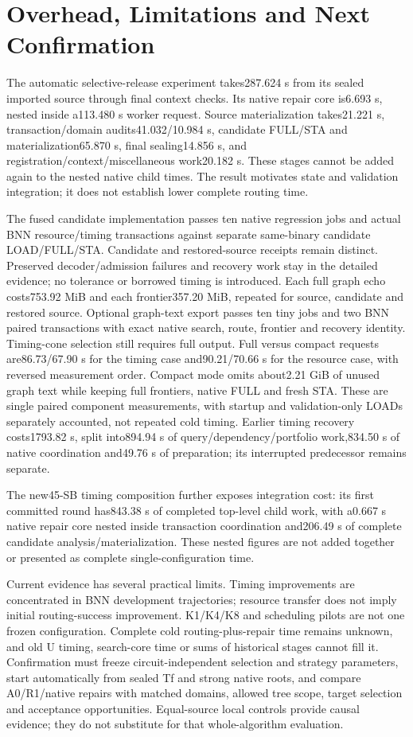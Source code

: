 \documentclass[conference,10pt]{IEEEtran}
\begin{document}
\section{Overhead, Limitations and Next Confirmation}
The automatic selective-release experiment takes287.624 s from its sealed imported source through final context checks. Its native repair core is6.693 s, nested inside a113.480 s worker request. Source materialization takes21.221 s, transaction/domain audits41.032/10.984 s, candidate FULL/STA and materialization65.870 s, final sealing14.856 s, and registration/context/miscellaneous work20.182 s. These stages cannot be added again to the nested native child times. The result motivates state and validation integration; it does not establish lower complete routing time.

The fused candidate implementation passes ten native regression jobs and actual BNN resource/timing transactions against separate same-binary candidate LOAD/FULL/STA. Candidate and restored-source receipts remain distinct. Preserved decoder/admission failures and recovery work stay in the detailed evidence; no tolerance or borrowed timing is introduced. Each full graph echo costs753.92 MiB and each frontier357.20 MiB, repeated for source, candidate and restored source. Optional graph-text export passes ten tiny jobs and two BNN paired transactions with exact native search, route, frontier and recovery identity. Timing-cone selection still requires full output. Full versus compact requests are86.73/67.90 s for the timing case and90.21/70.66 s for the resource case, with reversed measurement order. Compact mode omits about2.21 GiB of unused graph text while keeping full frontiers, native FULL and fresh STA. These are single paired component measurements, with startup and validation-only LOADs separately accounted, not repeated cold timing. Earlier timing recovery costs1793.82 s, split into894.94 s of query/dependency/portfolio work,834.50 s of native coordination and49.76 s of preparation; its interrupted predecessor remains separate.

The new45-SB timing composition further exposes integration cost: its first committed round has843.38 s of completed top-level child work, with a0.667 s native repair core nested inside transaction coordination and206.49 s of complete candidate analysis/materialization. These nested figures are not added together or presented as complete single-configuration time.

Current evidence has several practical limits. Timing improvements are concentrated in BNN development trajectories; resource transfer does not imply initial routing-success improvement. K1/K4/K8 and scheduling pilots are not one frozen configuration. Complete cold routing-plus-repair time remains unknown, and old U timing, search-core time or sums of historical stages cannot fill it. Confirmation must freeze circuit-independent selection and strategy parameters, start automatically from sealed Tf and strong native roots, and compare A0/R1/native repairs with matched domains, allowed tree scope, target selection and acceptance opportunities. Equal-source local controls provide causal evidence; they do not substitute for that whole-algorithm evaluation.
\end{document}
